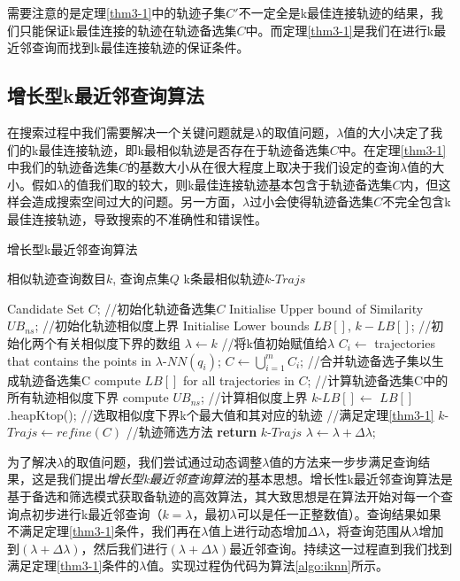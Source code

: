 需要注意的是定理\ref{thm3-1}中的轨迹子集$C'$不一定全是k最佳连接轨迹的结果，我们只能保证k最佳连接的轨迹在轨迹备选集$C$中。而定理\ref{thm3-1}是我们在进行k最近邻查询而找到k最佳连接轨迹的保证条件。
\\

\subsection{增长型k最近邻查询算法}
\label{subsec:iknn}
在搜索过程中我们需要解决一个关键问题就是$\lambda$的取值问题，$\lambda$值的大小决定了我们的k最佳连接轨迹，即k最相似轨迹是否存在于轨迹备选集$C$中。在定理\ref{thm3-1}中我们的轨迹备选集$C$的基数大小从在很大程度上取决于我们设定的查询$\lambda$值的大小。假如$\lambda$的值我们取的较大，则k最佳连接轨迹基本包含于轨迹备选集$C$内，但这样会造成搜索空间过大的问题。另一方面，$\lambda$过小会使得轨迹备选集$C$不完全包含k最佳连接轨迹，导致搜索的不准确性和错误性。
\\

\begin{algorithm}
\caption{增长型k最近邻查询算法}
\label{algo:iknn}
\begin{algorithmic}[1] %
\Require 相似轨迹查询数目$k$, 查询点集$Q$ %
\Ensure k条最相似轨迹$k$-$Trajs$ %

\State Candidate Set $C$; //初始化轨迹备选集$C$
\State Initialise Upper bound of Similarity $UB_{ns}$; //初始化轨迹相似度上界
\State Initialise Lower bounds $LB[]$, $k-LB[]$; //初始化两个有关相似度下界的数组
\State $\lambda \gets k$ //将k值初始赋值给$\lambda$
		\State $C_{i}\gets$ trajectories that contains the points in $\lambda$-$NN(q_{i})$;
	\EndFor
	\State $C \gets\bigcup_{i=1}^{m}C_{i}$; //合并轨迹备选子集以生成轨迹备选集C
		\State compute $LB[]$ for all trajectories in $C$; //计算轨迹备选集C中的所有轨迹相似度下界
		\State compute $UB_{ns}$; //计算相似度上界
		\State $k$-$LB[]\gets$ $LB[]$.heapKtop(); //选取相似度下界k个最大值和其对应的轨迹
		 //满足定理\ref{thm3-1}
			\State $k$-$Trajs\gets refine(C)$ //轨迹筛选方法
			\State \textbf{return} $k$-$Trajs$ 
		\EndIf 
	\EndIf
	\State $\lambda\gets\lambda+\Delta\lambda$;
\EndWhile
\end{algorithmic}
\end{algorithm}


为了解决$\lambda$的取值问题，我们尝试通过动态调整$\lambda$值的方法来一步步满足查询结果，这是我们提出\emph{增长型k最近邻查询算法}的基本思想。增长性k最近邻查询算法是基于备选和筛选模式获取备轨迹的高效算法，其大致思想是在算法开始对每一个查询点初步进行k最近邻查询（$k=\lambda$，最初$\lambda$可以是任一正整数值）。查询结果如果不满足定理\ref{thm3-1}条件，我们再在$\lambda$值上进行动态增加$\Delta\lambda$，将查询范围从$\lambda$增加到$(\lambda+\Delta\lambda)$，然后我们进行$(\lambda+\Delta\lambda)$最近邻查询。持续这一过程直到我们找到满足定理\ref{thm3-1}条件的$\lambda$值。实现过程伪代码为算法\ref{algo:iknn}所示。


